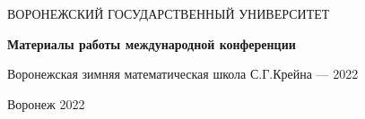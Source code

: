 \begin{titlepage}
   \begin{center}
   ВОРОНЕЖСКИЙ ГОСУДАРСТВЕННЫЙ УНИВЕРСИТЕТ
   \end{center}
\vspace{40mm}

    \begin{center}
      {\LARGE
      \bf

{\bf Материалы работы международной конференции}

 Воронежская зимняя математическая школа С.Г.Крейна --- 2022}

\vspace{10mm}


  \end{center}

 \begin{center}
   \vspace{50mm} Воронеж 2022
 \end{center}
\end{titlepage}
